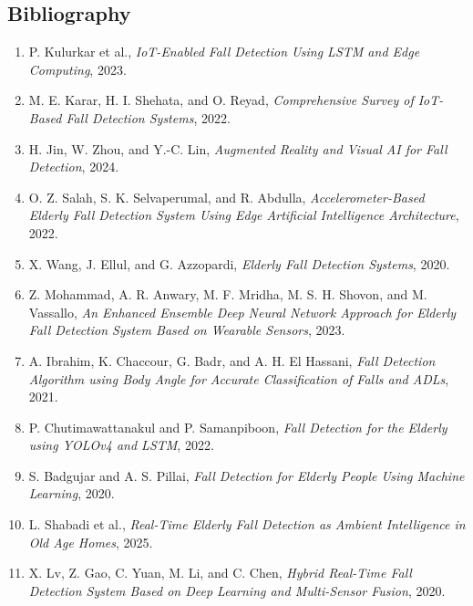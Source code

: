 \documentclass[a4paper, 12pt]{report}
\begin{document}
\begin{center}
    \chapter*{Bibliography}
\end{center}

\begin{enumerate}
    \item P. Kulurkar et al., \textit{IoT-Enabled Fall Detection Using LSTM and Edge Computing}, 2023.

    \item M. E. Karar, H. I. Shehata, and O. Reyad, \textit{Comprehensive Survey of IoT-Based Fall Detection Systems}, 2022.

    \item H. Jin, W. Zhou, and Y.-C. Lin, \textit{Augmented Reality and Visual AI for Fall Detection}, 2024.

    \item O. Z. Salah, S. K. Selvaperumal, and R. Abdulla, \textit{Accelerometer-Based Elderly Fall Detection System Using Edge Artificial Intelligence Architecture}, 2022.

    \item X. Wang, J. Ellul, and G. Azzopardi, \textit{Elderly Fall Detection Systems}, 2020.

    \item Z. Mohammad, A. R. Anwary, M. F. Mridha, M. S. H. Shovon, and M. Vassallo, \textit{An Enhanced Ensemble Deep Neural Network Approach for Elderly Fall Detection System Based on Wearable Sensors}, 2023.

    \item A. Ibrahim, K. Chaccour, G. Badr, and A. H. El Hassani, \textit{Fall Detection Algorithm using Body Angle for Accurate Classification of Falls and ADLs}, 2021.

    \item P. Chutimawattanakul and P. Samanpiboon, \textit{Fall Detection for the Elderly using YOLOv4 and LSTM}, 2022.

    \item S. Badgujar and A. S. Pillai, \textit{Fall Detection for Elderly People Using Machine Learning}, 2020.

    \item L. Shabadi et al., \textit{Real-Time Elderly Fall Detection as Ambient Intelligence in Old Age Homes}, 2025.

    \item X. Lv, Z. Gao, C. Yuan, M. Li, and C. Chen, \textit{Hybrid Real-Time Fall Detection System Based on Deep Learning and Multi-Sensor Fusion}, 2020.


\end{enumerate}
\end{document}
